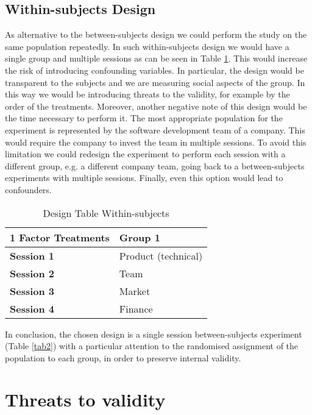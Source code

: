 \documentclass[runningheads]{llncs}
\begin{document}
\subsection{Within-subjects Design}

As alternative to the between-subjects design we could perform the study on the same population repeatedly. In such within-subjects design we would have a single group and multiple sessions as can be seen in Table \ref{tab3}. This would increase the risk of introducing confounding variables. In particular, the design would be transparent to the subjects and we are measuring social aspects of the group. In this way we would be introducing threats to the validity, for example by the order of the treatments. Moreover, another negative note of this design would be the time necessary to perform it. The most appropriate population for the experiment is represented by the software development team of a company. This would require the company to invest the team in multiple sessions. To avoid this limitation we could redesign the experiment to perform each session with a different group, e.g. a different company team, going back to a between-subjects experiments with multiple sessions. Finally, even this option would lead to confounders.

\begin{table}
\caption{Design Table Within-subjects}\label{tab3}
\begin{center}
\begin{tabular}{p{6cm}|p{6cm}}
\hline
\hline
\textbf{1 Factor\newline4 Treatments} & \textbf{Group 1}\\
\hline
\textbf{Session 1} & Product (technical)\\
\hline
\textbf{Session 2} & Team\\
\hline
\textbf{Session 3} & Market\\
\hline
\textbf{Session 4} & Finance\\
\hline
\end{tabular}
\end{center}
\end{table}

In conclusion, the chosen design is a single session between-subjects experiment (Table \ref{tab2}) with a particular attention to the randomised assignment of the population to each group, in order to preserve internal validity.

\section{Threats to validity}
\end{document}
